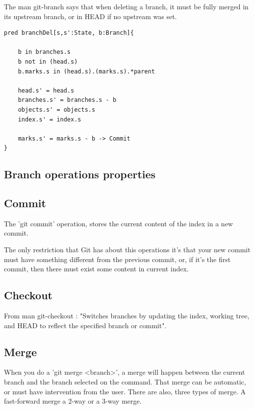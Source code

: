 The man git-branch says that when deleting a branch, it must be fully
merged in its upstream branch, or in HEAD if no upstream was set. \par

\begin{lstlisting}
pred branchDel[s,s':State, b:Branch]{
		
	b in branches.s
	b not in (head.s)
	b.marks.s in (head.s).(marks.s).*parent

	head.s' = head.s
	branches.s' = branches.s - b
	objects.s' = objects.s
	index.s' = index.s

	marks.s' = marks.s - b -> Commit
}
\end{lstlisting}


\subsection{Branch operations properties }

\subsection{Commit}

The 'git commit' operation, stores the current content of the index in a new
commit. \par
The only restriction that Git has about this operations 
it's that your new commit must have something different from the previous
commit, or, if it's the first commit, then there must exist some content in
current index. \par


\subsection{Checkout}

From man git-checkout : "Switches branches by updating the index, 
working tree, and HEAD to reflect the specified branch or commit". \par

\subsection{Merge}

When you do a 'git merge <branch>', a merge will happen between the current
branch and the branch selected on the command. That merge can be automatic, or
must have intervention from the user. There are also, three types of merge. A 
fast-forward merge a 2-way or a 3-way merge. \par
